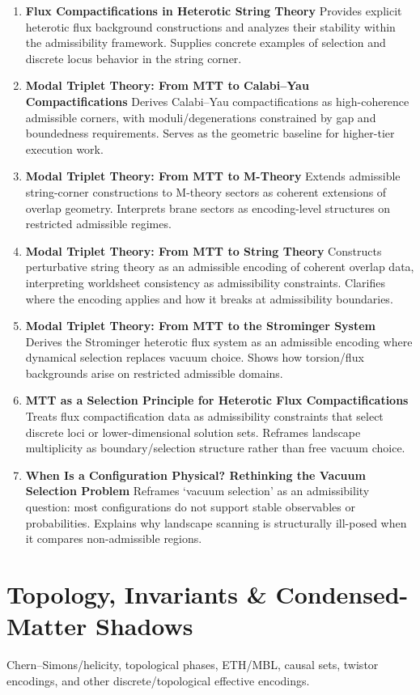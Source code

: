 \documentclass[11pt]{article}
\begin{document}
\begin{enumerate}[leftmargin=*]
\item \textbf{Flux Compactifications in Heterotic String Theory} Provides explicit heterotic flux background constructions and analyzes their stability within the admissibility framework. Supplies concrete examples of selection and discrete locus behavior in the string corner.
\item \textbf{Modal Triplet Theory: From MTT to Calabi–Yau Compactifications} Derives Calabi–Yau compactifications as high-coherence admissible corners, with moduli/degenerations constrained by gap and boundedness requirements. Serves as the geometric baseline for higher-tier execution work.
\item \textbf{Modal Triplet Theory: From MTT to M-Theory} Extends admissible string-corner constructions to M-theory sectors as coherent extensions of overlap geometry. Interprets brane sectors as encoding-level structures on restricted admissible regimes.
\item \textbf{Modal Triplet Theory: From MTT to String Theory} Constructs perturbative string theory as an admissible encoding of coherent overlap data, interpreting worldsheet consistency as admissibility constraints. Clarifies where the encoding applies and how it breaks at admissibility boundaries.
\item \textbf{Modal Triplet Theory: From MTT to the Strominger System} Derives the Strominger heterotic flux system as an admissible encoding where dynamical selection replaces vacuum choice. Shows how torsion/flux backgrounds arise on restricted admissible domains.
\item \textbf{MTT as a Selection Principle for Heterotic Flux Compactifications} Treats flux compactification data as admissibility constraints that select discrete loci or lower-dimensional solution sets. Reframes landscape multiplicity as boundary/selection structure rather than free vacuum choice.
\item \textbf{When Is a Configuration Physical? Rethinking the Vacuum Selection Problem} Reframes ‘vacuum selection’ as an admissibility question: most configurations do not support stable observables or probabilities. Explains why landscape scanning is structurally ill-posed when it compares non-admissible regions.
\end{enumerate}

\section{Topology, Invariants \& Condensed-Matter Shadows}
Chern–Simons/helicity, topological phases, ETH/MBL, causal sets, twistor encodings, and other discrete/topological effective encodings.
\end{document}
